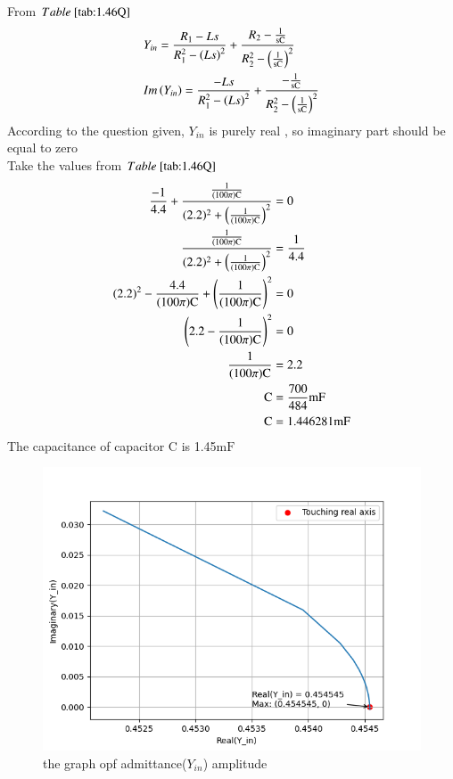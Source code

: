 \documentclass[a4,12pt,onecolumn]{IEEEtran}
\begin{document}
From $\tabref{tab:1.46Q}$
\begin{align} 
&Y_{in}=\frac{R_1-Ls}{R_1^2-\left(Ls\right)^2} + \frac{R_2-\frac{1}{ \text{sC}}}{R_2^2-\left(\frac{1}{ \text{sC}}\right)^2}\\
&Im\left(Y_{in}\right)=\frac{-Ls}{R_1^2-\left(Ls\right)^2} + \frac{-\frac{1}{ \text{sC}}}{R_2^2-\left(\frac{1}{ \text{sC}}\right)^2}
\end{align}
According to the question given, $Y_{in}$ is purely real , so imaginary part should be equal to zero\\
Take the values from $\tabref{tab:1.46Q}$\\
\begin{align}
 \frac{-1}{4.4}+\frac{\frac{1}{ (100\pi) \text{C}}}{(2.2)^2+\left(\frac{1}{ (100\pi) \text{C}}\right)^2}&=0\\ 
 \frac{\frac{1}{ (100\pi) \text{C}}}{(2.2)^2+\left(\frac{1}{ (100\pi) \text{C}}\right)^2}&=\frac{1}{4.4}\\
  (2.2)^2-\frac{4.4}{ (100\pi) \text{C}}+\left(\frac{1}{ (100\pi) \text{C}}\right)^2&=0\\
 \left(2.2-\frac{1}{ (100\pi) \text{C}}\right)^2&=0\\
 \frac{1}{ (100\pi) \text{C}}&=2.2\\
 \text{C}&=\frac{700}{484}\text{mF}\\
 \text{C}&=1.446281\text{mF}
\end{align}
The capacitance of capacitor $\text{C}$ is 1.45$\text{mF}$
\begin{figure}[ht!]
\includegraphics[width=\columnwidth]{figs/fig2.png}
\caption{\large{the graph opf admittance($Y_{in}$) amplitude}}
\end{figure}
\end{document}

